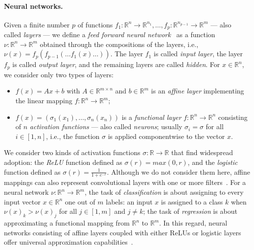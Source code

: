 \paragraph{Neural networks.} Given a finite number $p$ of functions 
$f_1: \mathbb{R}^n  \to \mathbb{R}^{n_1}, \ldots, f_p:
\mathbb{R}^{n_{p-1}} \to \mathbb{R}^{m}$ --- also called \emph{layers}
--- we define a \emph{feed forward neural network}~\cite{abdi1999neural}
as a function $\nu : \mathbb{R}^n \to \mathbb{R}^m$ obtained through
the compositions of the layers, i.e.,  $\nu(x) = f_p(f_{p-1}( \ldots
f_1(x) \ldots ))$. The layer $f_1$ is called \emph{input layer}, the
layer $f_p$ is called \emph{output layer}, and  the remaining layers
are called \emph{hidden}. For $x \in \mathbb{R}^n$, we consider only
two types of layers:
\begin{itemize}
	\item $f(x) = Ax + b$ with $A \in \mathbb{R}^{m \times n }$ and $b
	\in \mathbb{R}^m$ is an \emph{affine layer} implementing the
	linear mapping $f : \mathbb{R}^n \to 
	\mathbb{R}^m$;
	\item $f(x) = (\sigma_1(x_1), \ldots, \sigma_n(x_n))$ is a
	\emph{functional layer} $f: \mathbb{R}^n \to \mathbb{R}^n$
	consisting of $n$ \emph{activation 
		functions} --- also called \emph{neurons}; usually
	$\sigma_i = \sigma$ 
	for all $i \in [1,n]$, i.e., the function $\sigma$ is applied
	componentwise to the vector $x$. 
\end{itemize}
We consider two kinds of activation functions $\sigma: \mathbb{R} \to
\mathbb{R}$ that find widespread adoption: the \emph{ReLU} function
defined as $\sigma(r) = max(0,r)$, and the \emph{logistic} function
defined as $\sigma(r) = \frac{1}{1 + e^{-r}}$.
Although we do not consider them here, affine mappings
can also represent convolutional layers with one or more filters~\cite{DBLP:conf/sp/GehrMDTCV18}.
For a neural network $\nu : \mathbb{R}^n \to
\mathbb{R}^m$, the task of \emph{classification} is about assigning to
every input vector $x \in \mathbb{R}^n$ one out of $m$ labels: an
input $x$ is assigned to a class $k$ when $\nu(x)_k > \nu(x)_j$ for
all $j \in [1,m]$ and $j \neq k$; the task of \emph{regression} is
about approximating a functional mapping from $\mathbb{R}^n$ to
$\mathbb{R}^m$. 
In this regard, neural networks consisting of affine layers
coupled with either ReLUs or logistic layers offer universal
approximation capabilities~\cite{hornik1989multilayer}.

